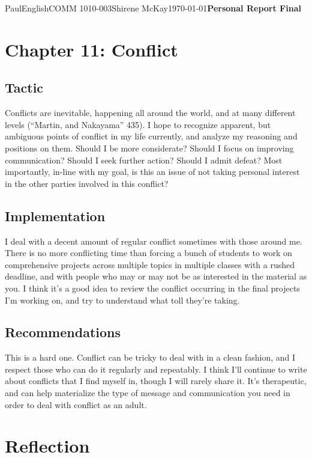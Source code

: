\documentclass[12pt,letterpaper]{article}
\begin{document}
\begin{mla}{Paul}{English}{COMM 1010-003}{Shirene
    McKay}{\today}{\textbf{Personal Report Final}}
\section{Chapter 11: Conflict}

\subsection{Tactic}

Conflicts are inevitable, happening all around the world, and at many different levels (``Martin, and Nakayama'' 435). I hope to recognize apparent, but ambiguous points of conflict in my life currently, and analyze my reasoning and positions on them. Should I be more considerate? Should I focus on improving communication? Should I seek further action? Should I admit defeat? Most importantly, in-line with my goal, is this an issue of not taking personal interest in the other parties involved in this conflict?

\subsection{Implementation}

I deal with a decent amount of regular conflict sometimes with those around me. There is no more conflicting time than forcing a bunch of students to work on comprehensive projects across multiple topics in multiple classes with a rushed deadline, and with people who may or may not be as interested in the material as you. I think it's a good idea to review the conflict occurring in the final projects I'm working on, and try to understand what toll they're taking.

\subsection{Recommendations}

This is a hard one. Conflict can be tricky to deal with in a clean fashion, and I respect those who can do it regularly and repeatably. I think I'll continue to write about conflicts that I find myself in, though I will rarely share it. It's therapeutic, and can help materialize the type of message and communication you need in order to deal with conflict as an adult.

\section{Reflection}


\end{mla}
\end{document}
